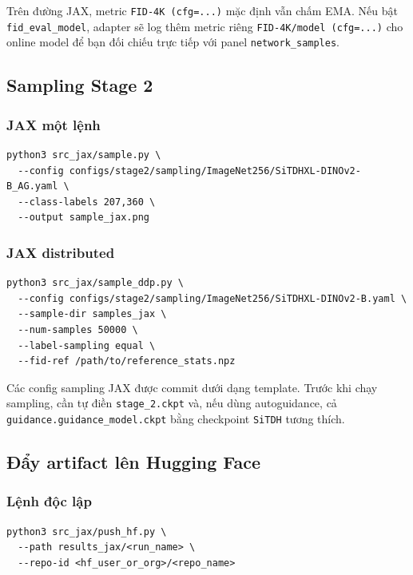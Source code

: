 Trên đường JAX, metric \texttt{FID-4K (cfg=...)} mặc định vẫn chấm EMA. Nếu bật
\texttt{fid\_eval\_model}, adapter sẽ log thêm metric riêng
\texttt{FID-4K/model (cfg=...)} cho online model để bạn đối chiếu trực tiếp với
panel \texttt{network\_samples}.

\subsection{Sampling Stage 2}

\subsubsection{JAX một lệnh}

\begin{lstlisting}[style=rae]
python3 src_jax/sample.py \
  --config configs/stage2/sampling/ImageNet256/SiTDHXL-DINOv2-B_AG.yaml \
  --class-labels 207,360 \
  --output sample_jax.png
\end{lstlisting}

\subsubsection{JAX distributed}

\begin{lstlisting}[style=rae]
python3 src_jax/sample_ddp.py \
  --config configs/stage2/sampling/ImageNet256/SiTDHXL-DINOv2-B.yaml \
  --sample-dir samples_jax \
  --num-samples 50000 \
  --label-sampling equal \
  --fid-ref /path/to/reference_stats.npz
\end{lstlisting}

Các config sampling JAX được commit dưới dạng template. Trước khi chạy sampling,
cần tự điền \texttt{stage\_2.ckpt} và, nếu dùng autoguidance, cả
\texttt{guidance.guidance\_model.ckpt} bằng checkpoint \texttt{SiTDH} tương
thích.

\subsection{Đẩy artifact lên Hugging Face}

\subsubsection{Lệnh độc lập}

\begin{lstlisting}[style=rae]
python3 src_jax/push_hf.py \
  --path results_jax/<run_name> \
  --repo-id <hf_user_or_org>/<repo_name>
\end{lstlisting}

